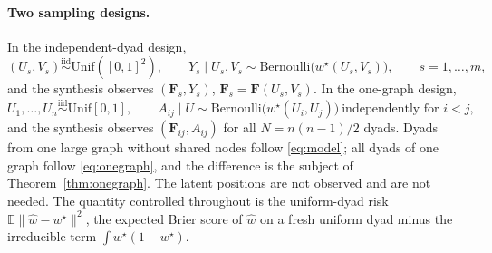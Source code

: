 \documentclass[12pt]{article}
\newcommand{\E}{\mathbb{E}}
\newcommand{\norm}[1]{\|#1\|}
\newcommand{\wstar}{w^{\star}}
\newcommand{\what}{\hat w}
\newcommand{\Fv}{\mathbf{F}}
\begin{document}
\paragraph{Two sampling designs.}
In the independent-dyad design,
\begin{equation}
\label{eq:model}
(U_s,V_s)\stackrel{\text{iid}}{\sim}\mathrm{Unif}([0,1]^2),\qquad Y_s\mid U_s,V_s\sim\mathrm{Bernoulli}\big(\wstar(U_s,V_s)\big),\qquad s=1,\dots,m,
\end{equation}
and the synthesis observes $(\Fv_s,Y_s)$, $\Fv_s=\Fv(U_s,V_s)$. In the one-graph design,
\begin{equation}
\label{eq:onegraph}
U_1,\dots,U_n\stackrel{\text{iid}}{\sim}\mathrm{Unif}[0,1],\qquad A_{ij}\mid U\sim\mathrm{Bernoulli}\big(\wstar(U_i,U_j)\big)\ \text{independently for } i<j,
\end{equation}
and the synthesis observes $(\Fv_{ij},A_{ij})$ for all $N=n(n-1)/2$ dyads. Dyads from one large graph without shared nodes follow \eqref{eq:model}; all dyads of one graph follow \eqref{eq:onegraph}, and the difference is the subject of Theorem~\ref{thm:onegraph}. The latent positions are not observed and are not needed. The quantity controlled throughout is the uniform-dyad risk $\E\norm{\what-\wstar}^2$, the expected Brier score of $\what$ on a fresh uniform dyad minus the irreducible term $\int\wstar(1-\wstar)$.
\end{document}

